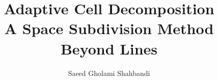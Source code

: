 \documentclass{article}
\title{Adaptive Cell Decomposition\\
A Space Subdivision Method Beyond Lines}
\author{Saeed Gholami Shahbandi}%
\begin{document}
\maketitle






\newpage
\begin{appendices}


\end{appendices}



\end{document}
